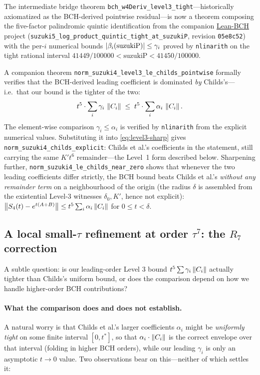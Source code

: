 The intermediate bridge theorem
\texttt{bch\_w4Deriv\_level3\_tight}---historically axiomatized as the
BCH-derived pointwise residual---is now a theorem composing the
five-factor palindromic quintic identification from the companion
\href{https://github.com/Jue-Xu/Lean-BCH}{Lean-BCH} project
(\texttt{suzuki5\_log\_product\_quintic\_tight\_at\_suzukiP}, revision
\texttt{05e8c52}) with the per-$i$ numerical bounds
$\left|\beta_i(\text{suzukiP})\right| \le \gamma_i$ proved by \texttt{nlinarith}
on the tight rational interval $41449/100000 < \text{suzukiP} <
41450/100000$.

A companion theorem \texttt{norm\_suzuki4\_level3\_le\_childs\_pointwise}
formally verifies that the BCH-derived leading coefficient is dominated \emph{by}
Childs's---i.e.\ that our bound is the tighter of the two:
\begin{equation}
  t^5 \cdot \sum_{i} \gamma_i\,\left\|C_i\right\|
    \;\le\;
  t^5 \cdot \sum_{i} \alpha_i\,\left\|C_i\right\|.
\end{equation}
The element-wise comparison $\gamma_i \le \alpha_i$ is verified by
\texttt{nlinarith} from the explicit numerical values. Substituting it into
\cref{eq:level3-sharp} gives \texttt{norm\_suzuki4\_childs\_explicit}:
Childs et al.'s coefficients in the statement, still carrying the same
$K' t^6$ remainder---the Level~1 form described below. Sharpening further,
\texttt{norm\_suzuki4\_le\_childs\_near\_zero} shows that whenever the two
leading coefficients differ strictly, the BCH bound beats Childs et al.'s
\emph{without any remainder term} on a neighbourhood of the origin (the
radius $\delta$ is assembled from the existential Level-3 witnesses
$\delta_0, K'$, hence not explicit):
$\left\|S_4(t) - e^{t(A+B)}\right\| \le t^5 \sum_i \alpha_i \left\|C_i\right\|$ for
$0 \le t < \delta$.

\subsection{A local small-\texorpdfstring{$\tau$}{tau} refinement at order \texorpdfstring{$\tau^7$}{tau7}: the \texorpdfstring{$R_7$}{R7} correction}
\label{sec:r7}

A subtle question: is our leading-order Level 3 bound $t^5 \sum \gamma_i \left\|C_i\right\|$
actually tighter than Childs's uniform bound, or does the comparison depend
on how we handle higher-order BCH contributions?

\paragraph{What the comparison does and does not establish.}
A natural worry is that Childs et al.'s larger coefficients $\alpha_i$ might
be \emph{uniformly tight} on some finite interval $[0, t^*]$, so that
$\alpha_i \cdot \left\|C_i\right\|$ is the correct envelope over that interval
(folding in higher BCH orders), while our leading $\gamma_i$ is only an
asymptotic $t \to 0$ value. Two observations bear on this---neither of
which settles it:

